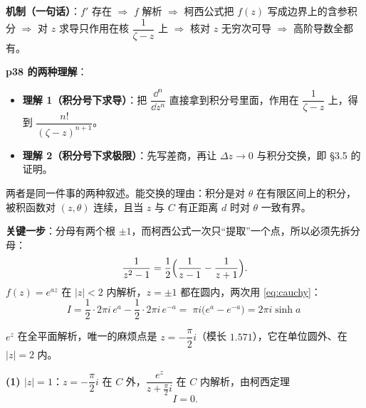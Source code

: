 \textbf{机制（一句话）}：$f'$ 存在 $\Rightarrow$ $f$ 解析 $\Rightarrow$ 柯西公式把 $f(z)$ 写成边界上的含参积分 $\Rightarrow$ 对 $z$ 求导只作用在核 $\dfrac{1}{\zeta-z}$ 上 $\Rightarrow$ 核对 $z$ 无穷次可导 $\Rightarrow$ 高阶导数全都有。


\textbf{p38 的两种理解}：

\begin{itemize}
\item \textbf{理解 1（积分号下求导）}：把 $\dfrac{\dd^{n}}{\dd z^{n}}$ 直接拿到积分号里面，作用在 $\dfrac{1}{\zeta-z}$ 上，得到 $\dfrac{n!}{(\zeta-z)^{n+1}}$。
\item \textbf{理解 2（积分号下求极限）}：先写差商，再让 $\Delta z\to0$ 与积分交换，即 §3.5 的证明。
\end{itemize}

两者是同一件事的两种叙述。能交换的理由：积分是对 $\theta$ 在有限区间上的积分，被积函数对 $(z,\theta)$ 连续，且当 $z$ 与 $C$ 有正距离 $d$ 时对 $\theta$ 一致有界。


\qbreak
{}

\textbf{关键一步}：分母有两个根 $\pm1$，而柯西公式一次只“提取”一个点，所以必须先拆分母：
\[ \frac{1}{z^{2}-1}=\frac12\Bigl(\frac{1}{z-1}-\frac{1}{z+1}\Bigr) . \]
$f(z)=e^{az}$ 在 $|z|<2$ 内解析，$z=\pm1$ 都在圆内，两次用 \eqref{eq:cauchy}：
\[ I=\frac12\cdot2\pi i\,e^{a}-\frac12\cdot2\pi i\,e^{-a}
=\boxed{\;\pi i\bigl(e^{a}-e^{-a}\bigr)=2\pi i\sinh a\;} \]


\qbreak
{}

$e^{z}$ 在全平面解析，唯一的麻烦点是 $z=-\dfrac{\pi}{2}i$（模长 $1.571$），它在单位圆外、在 $|z|=2$ 内。

\textbf{(1) $|z|=1$}：$z=-\dfrac{\pi}{2}i$ 在 $C$ 外，$\dfrac{e^{z}}{z+\frac{\pi}{2}i}$ 在 $C$ 内解析，由柯西定理
\[ I=0 . \]

